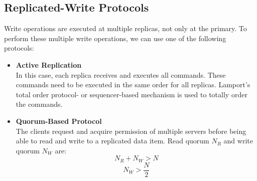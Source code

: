 \documentclass{article}
\begin{document}
\subsection{Replicated-Write Protocols}
Write operations are executed at multiple replicas, not only at the primary. To perform these multiple write operations, we can use one of the following protocols:
\begin{itemize}
	\item \textbf{Active Replication} \\
	In this case, each replica receives and executes all commands. These commands need to be executed in the same order for all replicas. Lamport's total order protocol- or sequencer-based mechanism is used to totally order the commands.
	\item \textbf{Quorum-Based Protocol} \\
	The clients request and acquire permission of multiple servers before being able to read and write to a replicated data item. Read quorum $N_R$ and write quorum $N_W$ are:
	\[ N_R + N_W > N \]
	\[ N_W > \frac{N}{2} \]
\end{itemize}
\end{document}
